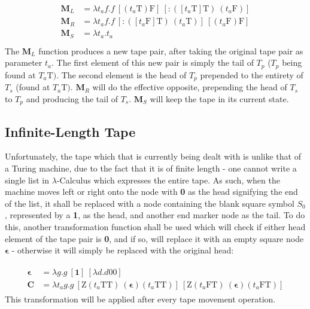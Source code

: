 \documentclass[Master.tex]{subfiles}
\begin{document}
\begin{gather*}
\begin{aligned}
\bm{M}_L &= \lambda t_a f.f\ [(t_a\bm{\mathrm{T}})\bm{\mathrm{F}}]\ [\bm{\mathrm{:}}([t_a\bm{\mathrm{T}}]\bm{\mathrm{T}})\ (t_a\bm{\mathrm{F}})]\\
\bm{M}_R &= \lambda t_a f.f\ [\bm{\mathrm{:}}([t_a\bm{\mathrm{F}}]\bm{\mathrm{T}})\ (t_a\bm{\mathrm{T}})]\ [(t_a\bm{\mathrm{F}})\bm{\mathrm{F}}]\\
\bm{M}_S &= \lambda t_a.t_a\\
\end{aligned}
\end{gather*}
The $\bm{M}_L$ function produces a new tape pair, after taking the original tape pair as parameter $t_a$. The first element of this new pair is simply the tail of $T_p$ ($T_p$ being found at $T_a\bm{\mathrm{T}})$. The second element is the head of $T_p$ prepended to the entirety of $T_s$ (found at $T_a\bm{\mathrm{T}})$. $\bm{M}_R$ will do the effective opposite, prepending the head of $T_s$ to $T_p$ and producing the tail of $T_s$. $\bm{M}_S$ will keep the tape in its current state.

\subsection{Infinite-Length Tape}

Unfortunately, the tape which that is currently being dealt with is unlike that of a Turing machine, due to the fact that it is of finite length - one cannot write a single list in $\lambda$-Calculus which expresses the entire tape. As such, when the machine moves left or right onto the node with \textbf{0} as the head signifying the end of the list, it shall be replaced with a node containing the blank square symbol $S_0$, represented by a \textbf{1}, as the head, and another end marker node as the tail. To do this, another transformation function shall be used which will check if either head element of the tape pair is \textbf{0}, and if so, will replace it with an empty square node $\bm{\epsilon}$ - otherwise it will simply be replaced with the original head:

\begin{gather*}
\begin{aligned}
\bm{\epsilon} &= \lambda g.g\ [\bm{\textbf{1}}]\ [\lambda d.d\bm{\mathrm{0}}\bm{\mathrm{0}}] \\
\bm{C} &= \lambda t_a g.g\ [\bm{\mathrm{Z}}(t_a\bm{\mathrm{T}}\bm{\mathrm{T}})\ (\bm{\epsilon})(t_a\bm{\mathrm{T}}\bm{\mathrm{T}})]\ [\bm{\mathrm{Z}}(t_a\bm{\mathrm{F}}\bm{\mathrm{T}})\ (\bm{\epsilon})(t_a\bm {\mathrm{F}}\bm{\mathrm{T}})]
\end{aligned}
\end{gather*}
This transformation will be applied after every tape movement operation.
\end{document}
